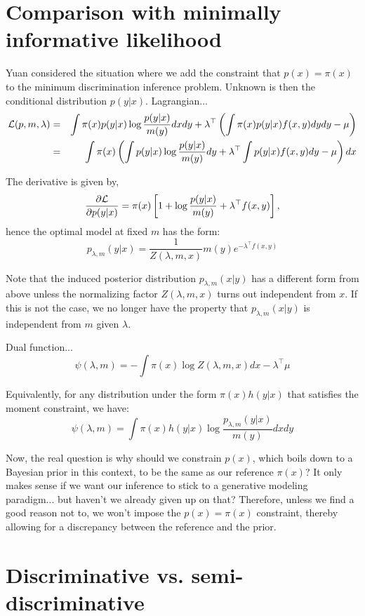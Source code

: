 \documentclass[english]{scrartcl}
\begin{document}
\section{Comparison with minimally informative likelihood}

Yuan \cite{Yuan-99} considered the situation where we add the
constraint that $p(x)=\pi(x)$ to the minimum discrimination inference
problem. Unknown is then the conditional distribution
$p(y|x)$. Lagrangian...
\begin{eqnarray*}
{\cal L}(p,m,\lambda)
 & = & 
\int \pi(x)p(y|x) \log \frac{p(y|x)}{m(y)} dxdy
+
\lambda^\top \left( 
\int \pi(x)p(y|x) f(x,y) dydy - \mu 
\right) \\
 & = & 
\int \pi(x)
\left( 
\int
p(y|x) \log \frac{p(y|x)}{m(y)} dy
+
\lambda^\top 
\int p(y|x) f(x,y) dy
- \mu 
\right)
dx 
\end{eqnarray*}

The derivative is given by,
$$
\frac{\partial\cal L}{\partial p(y|x)}
= 
\pi(x)\left[ 
1 + \log \frac{p(y|x)}{m(y)} 
+ \lambda^\top f(x,y)
\right],
$$
hence the optimal model at fixed $m$ has the form:
$$
p_{\lambda,m}(y|x) = \frac{1}{Z(\lambda,m,x)} m(y) e^{-\lambda^\top f(x,y)} 
$$

Note that the induced posterior distribution $p_{\lambda,m}(x|y)$ has
a different form from above unless the normalizing factor
$Z(\lambda,m,x)$ turns out independent from $x$. If this is not the
case, we no longer have the property that $p_{\lambda,m}(x|y)$ is
independent from $m$ given $\lambda$.

Dual function...
$$
\psi(\lambda,m) 
=
- \int \pi(x) \log Z(\lambda, m, x) dx
- \lambda^\top \mu
$$

Equivalently, for any distribution under the form $\pi(x)h(y|x)$ that
satisfies the moment constraint, we have:
$$
\psi(\lambda,m) 
=
\int \pi(x) h(y|x) \log \frac{p_{\lambda,m}(y|x)}{m(y)} dxdy
$$

Now, the real question is why should we constrain $p(x)$, which boils
down to a Bayesian prior in this context, to be the same as our
reference $\pi(x)$? It only makes sense if we want our inference to
stick to a generative modeling paradigm... but haven't we already
given up on that? Therefore, unless we find a good reason not to, we
won't impose the $p(x)=\pi(x)$ constraint, thereby allowing for a
discrepancy between the reference and the prior.


\section{Discriminative vs. semi-discriminative}
\end{document}
